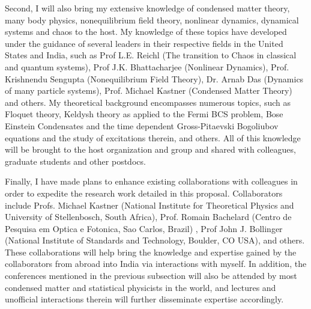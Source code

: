 \documentclass[a4paper,11pt,color]{article}
\begin{document}
Second, I will also bring my extensive knowledge of condensed matter theory, many body physics, nonequilibrium field theory, nonlinear dynamics, dynamical systems and chaos to the host. My knowledge of these topics have developed under the guidance of several leaders in their respective fields in the United States and India, such as Prof L.E. Reichl (The transition to Chaos in classical and quantum systems), Prof J.K. Bhattacharjee (Nonlinear Dynamics), Prof. Krishnendu Sengupta (Nonequilibrium Field Theory), Dr. Arnab Das (Dynamics of many particle systems), Prof. Michael Kastner (Condensed Matter Theory) and others. My theoretical background encompasses numerous topics, such as  Floquet theory, Keldysh theory as applied to the Fermi BCS problem, Bose Einstein Condensates and the time dependent Gross-Pitaevski Bogoliubov equations and the study of excitations therein, and others. All of this knowledge will be brought to the host organization and group and shared with colleagues, graduate students and other postdocs.

Finally, I have made plans to enhance existing collaborations with colleagues in order to expedite the research work detailed in this proposal. Collaborators include  Profs. Michael Kastner  (National Institute for Theoretical Physics and University of Stellenbosch, South Africa), Prof. Romain Bachelard (Centro de Pesquisa em Optica e Fotonica, Sao Carlos, Brazil)  , Prof  John J. Bollinger (National Institute of Standards and Technology, Boulder, CO USA), and others. These collaborations will help bring the knowledge and expertise gained by the collaborators from abroad into India via interactions with myself. In addition, the conferences  mentioned in the previous subsection will also be attended by most condensed matter and statistical physicists in the world, and lectures and unofficial interactions therein will further disseminate expertise accordingly.
\end{document}
